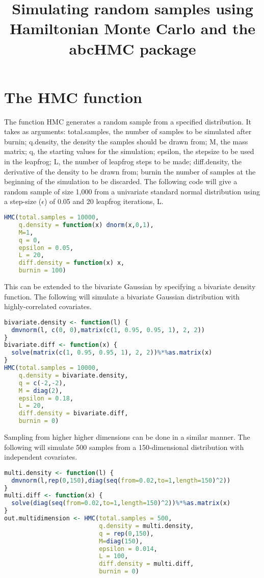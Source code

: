 \documentclass[10pt,a4paper,landscape]{article}
\title{Simulating random samples using Hamiltonian Monte Carlo and the abcHMC package}
\begin{document}
\maketitle
\section{The HMC function}
The function HMC generates a random sample from a specified distribution. It
takes as arguments: total.samples, the number of samples to be simulated after
burnin; q.density, the density the samples should be drawn from; M, the mass
matrix; q, the starting values for the simulation; epsilon, the stepsize to be used in the leapfrog; L, the number of leapfrog steps to be made; diff.density, the derivative of the density to be drawn from; burnin the number of samples at
the beginning of the simulation to be discarded.
The following code will give a random sample of size 1,000 from a univariate
standard normal distribution using a step-size ($\epsilon$) of 0.05 and 20 leapfrog iterations, L.
\begin{lstlisting}[backgroundcolor = \color{lightgray},
                   language = R,
                   framexleftmargin = 1em]
HMC(total.samples = 10000, 
    q.density = function(x) dnorm(x,0,1), 
    M=1, 
    q = 0, 
    epsilon = 0.05, 
    L = 20, 
    diff.density = function(x) x, 
    burnin = 100)
\end{lstlisting}

This can be extended to the bivariate Gaussian by specifying a bivariate density
function. The following will simulate a bivariate Gaussian distribution with
highly-correlated covariates.

\begin{lstlisting}[backgroundcolor = \color{lightgray},
                   language = R,
                   framexleftmargin = 1em]
bivariate.density <- function(l) {
  dmvnorm(l, c(0, 0),matrix(c(1, 0.95, 0.95, 1), 2, 2))
}
bivariate.diff <- function(x) {
  solve(matrix(c(1, 0.95, 0.95, 1), 2, 2))%*%as.matrix(x)
}
HMC(total.samples = 10000, 
    q.density = bivariate.density, 
    q = c(-2,-2), 
    M = diag(2), 
    epsilon = 0.18, 
    L = 20, 
    diff.density = bivariate.diff, 
    burnin = 0)
\end{lstlisting}

Sampling from higher higher dimensions can be done in a similar manner. The
following will simulate 500 samples from a 150-dimensional distribution with
independent covariates.
\begin{lstlisting}[backgroundcolor = \color{lightgray},
                   language = R,
                   framexleftmargin = 1em]
multi.density <- function(l) {
  dmvnorm(l,rep(0,150),diag(seq(from=0.02,to=1,length=150)^2))
}
multi.diff <- function(x) {
  solve(diag(seq(from=0.02,to=1,length=150)^2))%*%as.matrix(x)
}
out.multidimension <- HMC(total.samples = 500, 
                          q.density = multi.density, 
                          q = rep(0,150), 
                          M=diag(150), 
                          epsilon = 0.014, 
                          L = 100, 
                          diff.density = multi.diff, 
                          burnin = 0)
\end{lstlisting}
\end{document}
